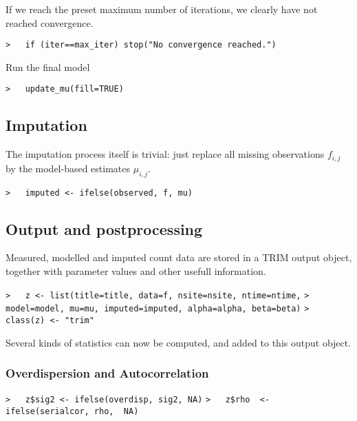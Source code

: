 \documentclass[a4paper]{article}
\begin{document}
If we reach the preset maximum number of iterations, we clearly have not reached
convergence.\par
\verb~>   if (iter==max_iter) stop("No convergence reached.")~\par

Run the final model\par
\verb~>   update_mu(fill=TRUE)~\par



\subsection{Imputation}
The imputation process itself is trivial: just replace all missing observations
$f_{i,j}$ by the model-based estimates $\mu_{i,j}$.\par
\verb~>   imputed <- ifelse(observed, f, mu)~\par




\subsection{Output and postprocessing}\par

Measured, modelled and imputed count data are stored in a TRIM output object,
together with parameter values and other usefull information.\par

\verb~>   z <- list(title=title, data=f, nsite=nsite, ntime=ntime,~\newline
\verb~>             model=model, mu=mu, imputed=imputed, alpha=alpha, beta=beta)~\newline
\verb~>   class(z) <- "trim"~\par

Several kinds of statistics can now be computed, and added to this output object.\par



\subsubsection{Overdispersion and Autocorrelation}\par

\verb~>   z$sig2 <- ifelse(overdisp, sig2, NA)~\newline
\verb~>   z$rho  <- ifelse(serialcor, rho,  NA)~\par
\end{document}
